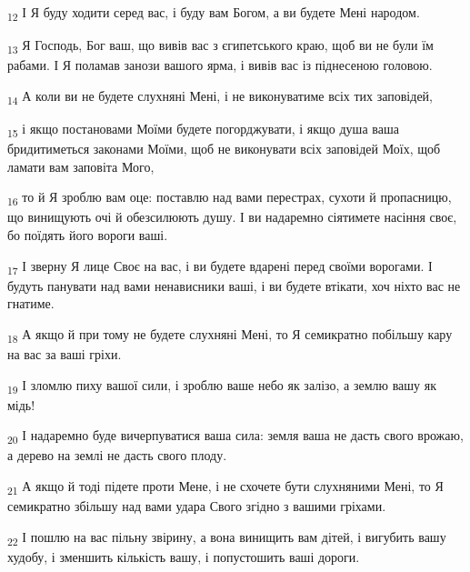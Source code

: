 \begin{tcolorbox}
\textsubscript{12} І Я буду ходити серед вас, і буду вам Богом, а ви будете Мені народом.
\end{tcolorbox}
\begin{tcolorbox}
\textsubscript{13} Я Господь, Бог ваш, що вивів вас з єгипетського краю, щоб ви не були їм рабами. І Я поламав занози вашого ярма, і вивів вас із піднесеною головою.
\end{tcolorbox}
\begin{tcolorbox}
\textsubscript{14} А коли ви не будете слухняні Мені, і не виконуватиме всіх тих заповідей,
\end{tcolorbox}
\begin{tcolorbox}
\textsubscript{15} і якщо постановами Моїми будете погорджувати, і якщо душа ваша бридитиметься законами Моїми, щоб не виконувати всіх заповідей Моїх, щоб ламати вам заповіта Мого,
\end{tcolorbox}
\begin{tcolorbox}
\textsubscript{16} то й Я зроблю вам оце: поставлю над вами перестрах, сухоти й пропасницю, що винищують очі й обезсилюють душу. І ви надаремно сіятимете насіння своє, бо поїдять його вороги ваші.
\end{tcolorbox}
\begin{tcolorbox}
\textsubscript{17} І зверну Я лице Своє на вас, і ви будете вдарені перед своїми ворогами. І будуть панувати над вами ненависники ваші, і ви будете втікати, хоч ніхто вас не гнатиме.
\end{tcolorbox}
\begin{tcolorbox}
\textsubscript{18} А якщо й при тому не будете слухняні Мені, то Я семикратно побільшу кару на вас за ваші гріхи.
\end{tcolorbox}
\begin{tcolorbox}
\textsubscript{19} І зломлю пиху вашої сили, і зроблю ваше небо як залізо, а землю вашу як мідь!
\end{tcolorbox}
\begin{tcolorbox}
\textsubscript{20} І надаремно буде вичерпуватися ваша сила: земля ваша не дасть свого врожаю, а дерево на землі не дасть свого плоду.
\end{tcolorbox}
\begin{tcolorbox}
\textsubscript{21} А якщо й тоді підете проти Мене, і не схочете бути слухняними Мені, то Я семикратно збільшу над вами удара Свого згідно з вашими гріхами.
\end{tcolorbox}
\begin{tcolorbox}
\textsubscript{22} І пошлю на вас пільну звірину, а вона винищить вам дітей, і вигубить вашу худобу, і зменшить кількість вашу, і попустошить ваші дороги.
\end{tcolorbox}

